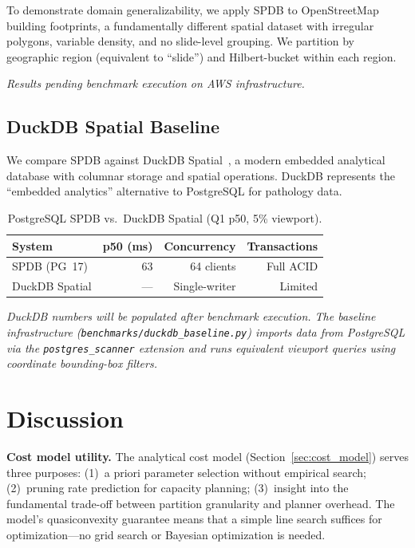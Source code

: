 \documentclass[sigconf]{acmart}
\begin{document}
To demonstrate domain generalizability, we apply SPDB to OpenStreetMap building footprints, a fundamentally different spatial dataset with irregular polygons, variable density, and no slide-level grouping.
We partition by geographic region (equivalent to ``slide'') and Hilbert-bucket within each region.

\textit{Results pending benchmark execution on AWS infrastructure.}

\subsection{DuckDB Spatial Baseline}
\label{sec:duckdb}

We compare SPDB against DuckDB Spatial~\cite{duckdb2019}, a modern embedded analytical database with columnar storage and spatial operations.
DuckDB represents the ``embedded analytics'' alternative to PostgreSQL for pathology data.

\begin{table}[t]
\centering
\caption{PostgreSQL SPDB vs.\ DuckDB Spatial (Q1 p50, 5\% viewport).}
\label{tab:duckdb}
\scriptsize
\begin{tabular}{@{}lrrr@{}}
\toprule
\textbf{System} & \textbf{p50 (ms)} & \textbf{Concurrency} & \textbf{Transactions} \\
\midrule
SPDB (PG~17) & 63 & 64 clients & Full ACID \\
DuckDB Spatial & --- & Single-writer & Limited \\
\bottomrule
\end{tabular}
\end{table}

\textit{DuckDB numbers will be populated after benchmark execution.
The baseline infrastructure (\texttt{benchmarks/duckdb\_baseline.py}) imports data from PostgreSQL via the \texttt{postgres\_scanner} extension and runs equivalent viewport queries using coordinate bounding-box filters.}

\section{Discussion}
\label{sec:discussion}

\textbf{Cost model utility.}
The analytical cost model (Section~\ref{sec:cost_model}) serves three purposes:
(1)~a priori parameter selection without empirical search;
(2)~pruning rate prediction for capacity planning;
(3)~insight into the fundamental trade-off between partition granularity and planner overhead.
The model's quasiconvexity guarantee means that a simple line search suffices for optimization---no grid search or Bayesian optimization is needed.
\end{document}
